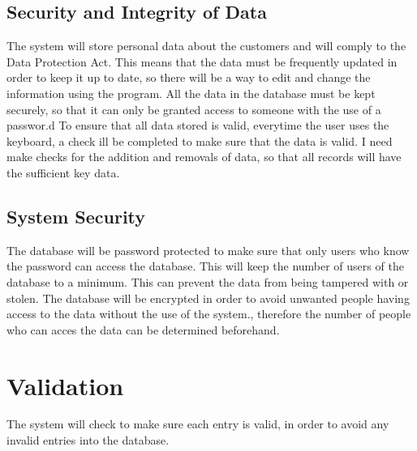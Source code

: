 \subsection{Security and Integrity of Data}
The system will store personal data about the customers and will comply to the Data Protection Act. This means that the data must be frequently updated in order to keep it up to date, so there will be a way to edit and change the information using the program. All the data in the database must be kept securely, so that it can only be granted access to someone with the use of a passwor.d To ensure that all data stored is valid, everytime the user uses the keyboard, a check ill be completed to make sure that the data is valid. I need make checks for the addition and removals of data, so that all records will have the sufficient key data.

\subsection{System Security}

The database will be password protected to make sure that only users who know the password can access the database. This will keep the number of users of the database to a minimum. This can prevent the data from being tampered with or stolen. The database will be encrypted in order to avoid unwanted people having access to the data without the use of the system., therefore the number of people who can acces the data can be determined beforehand.

\section{Validation}

The system will check to make sure each entry is valid, in order to avoid any invalid entries into the database. 
 
